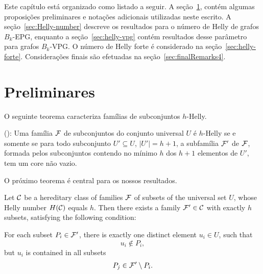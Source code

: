 Este capítulo está organizado como listado a seguir. A seção~\ref{sec:preliminares4}, contém algumas proposições preliminares e notações adicionais utilizadas neste escrito. A seção~\ref{sec:Helly-number}  descreve os resultados para o número de Helly de grafos $B_k$-EPG, enquanto a seção~\ref{sec:helly-vpg} contém resultados desse parâmetro para grafos $B_k$-VPG. O número de Helly forte é considerado na seção~\ref{sec:helly-forte}. Considerações finais são efetuadas na seção~\ref{sec:finalRemarks4}.

\section{Preliminares}\label{sec:preliminares4}

O seguinte teorema caracteriza famílias de subconjuntos $h$-Helly.


\begin{theorem}\label{thm:BD}(\cite{bergeDuchet1975}):
Uma família $\cal{F}$ de subconjuntos do conjunto universal  $U$ é $h$-Helly se e somente se para todo subconjunto   $U' \subseteq U$, $|U'|= h+1$,  a subfamília  $\cal{F'}$ de $\cal{F}$,  formada pelos subconjuntos contendo no mínimo  $h$ dos $h+1$ elementos de $U'$, tem um core não vazio. 
\end{theorem}

O próximo teorema é central para os nossos resultados.

\begin{theorem}\label{thm:minimal}
Let ${\cal C}$ be a hereditary class of families ${\cal F}$ of subsets of the universal set $U$, whose Helly number $H({\cal C})$ equals $h$. Then there exists a family ${\cal F'} \in {\cal C}$ with exactly $h$ subsets, satisfying the following condition: 

For each subset $P_i \in \cal {F'}$, there is exactly one distinct element $u_i \in U$, such that \\
$$u_i \not \in P_i,$$ 
but $u_i$ is contained in all  subsets 
$$P_j \in {\cal F'} \setminus P_i.$$
\end{theorem}
 

